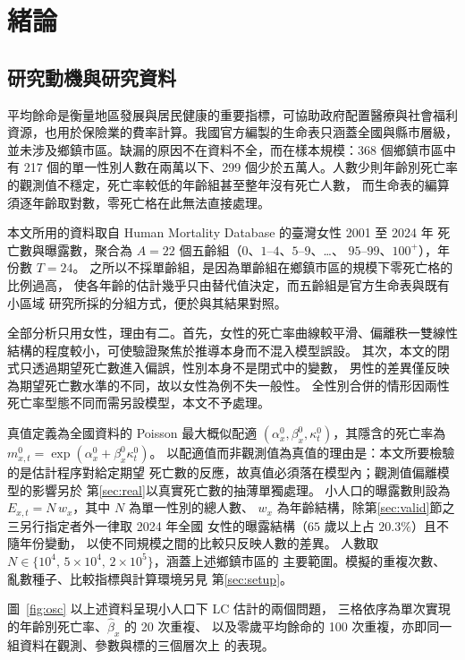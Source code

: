 \documentclass[UTF8, fontset=macnew, a4paper, 12pt]{ctexart}
\begin{document}
\vspace{10pt}

\section{緒論}\label{sec:intro}

\subsection{研究動機與研究資料}

平均餘命是衡量地區發展與居民健康的重要指標，可協助政府配置醫療與社會福利
資源，也用於保險業的費率計算。我國官方編製的生命表只涵蓋全國與縣市層級，
並未涉及鄉鎮市區。缺漏的原因不在資料不全，而在樣本規模：368 個鄉鎮市區中
有 217 個的單一性別人數在兩萬以下、299 個少於五萬人。人數少則年齡別死亡率
的觀測值不穩定，死亡率較低的年齡組甚至整年沒有死亡人數，
而生命表的編算須逐年齡取對數，零死亡格在此無法直接處理。

本文所用的資料取自 Human Mortality Database 的臺灣女性 2001 至 2024 年
死亡數與曝露數，聚合為 $A=22$ 個五齡組（$0$、$1$--$4$、$5$--$9$、\dots、
$95$--$99$、$100^{+}$），年份數 $T=24$。
之所以不採單齡組，是因為單齡組在鄉鎮市區的規模下零死亡格的比例過高，
使各年齡的估計幾乎只由替代值決定，而五齡組是官方生命表與既有小區域
研究所採的分組方式，便於與其結果對照。

全部分析只用女性，理由有二。首先，女性的死亡率曲線較平滑、偏離秩一雙線性
結構的程度較小，可使驗證聚焦於推導本身而不混入模型誤設。
其次，本文的閉式只透過期望死亡數進入偏誤，性別本身不是閉式中的變數，
男性的差異僅反映為期望死亡數水準的不同，故以女性為例不失一般性。
全性別合併的情形因兩性死亡率型態不同而需另設模型，本文不予處理。

真值定義為全國資料的 Poisson 最大概似配適
$(\alpha^{0}_x,\beta^{0}_x,\kappa^{0}_t)$，其隱含的死亡率為
$m^{0}_{x,t}=\exp(\alpha^{0}_x+\beta^{0}_x\kappa^{0}_t)$。
以配適值而非觀測值為真值的理由是：本文所要檢驗的是估計程序對給定期望
死亡數的反應，故真值必須落在模型內；觀測值偏離模型的影響另於
第\ref{sec:real}以真實死亡數的抽薄單獨處理。
小人口的曝露數則設為 $E_{x,t}=N\,w_x$，其中 $N$ 為單一性別的總人數、
$w_x$ 為年齡結構，除第\ref{sec:valid}節之三另行指定者外一律取 2024 年全國
女性的曝露結構（$65$ 歲以上占 $20.3\%$）且不隨年份變動，
以使不同規模之間的比較只反映人數的差異。
人數取 $N\in\{10^4,\,5\times10^4,\,2\times10^5\}$，涵蓋上述鄉鎮市區的
主要範圍。模擬的重複次數、亂數種子、比較指標與計算環境另見
第\ref{sec:setup}。

圖~\ref{fig:osc} 以上述資料呈現小人口下 LC 估計的兩個問題，
三格依序為單次實現的年齡別死亡率、$\hat\beta_x$ 的 20 次重複、
以及零歲平均餘命的 100 次重複，亦即同一組資料在觀測、參數與標的三個層次上
的表現。
\end{document}
